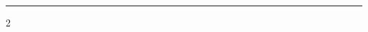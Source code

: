 \documentclass[12pt,a4paper]{article}
\begin{document}
\noindent

\vspace{0.55em}
{\color{rulegray}\rule{\textwidth}{0.6pt}}
\vspace{0.35em}

\begin{paracol}{2}
\raggedright
\switchcolumn
\raggedright
\end{paracol}
\end{document}
